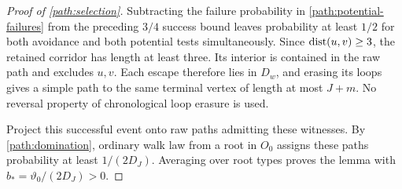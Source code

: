 \begin{proof}[Proof of \cref{path:selection}]
Subtracting the failure probability in \eqref{path:potential-failures}
from the preceding $3/4$ success bound leaves probability at least
$1/2$ for both avoidance and both potential tests simultaneously.
Since $\operatorname{dist}(u,v)\ge3$, the retained corridor has length at least three.
Its interior is contained in the raw path and excludes $u,v$. Each
escape therefore lies in $D_w$, and erasing its loops gives a simple
path to the same terminal vertex of length at most $J+m$. No reversal
property of chronological loop erasure is used.

Project this successful event onto raw paths admitting these witnesses.
By \eqref{path:domination}, ordinary walk law from a root in $O_0$
assigns these paths probability at least $1/(2D_J)$. Averaging over
root types proves the lemma with
$b_*=\vartheta_0/(2D_J)>0$.
\end{proof}
